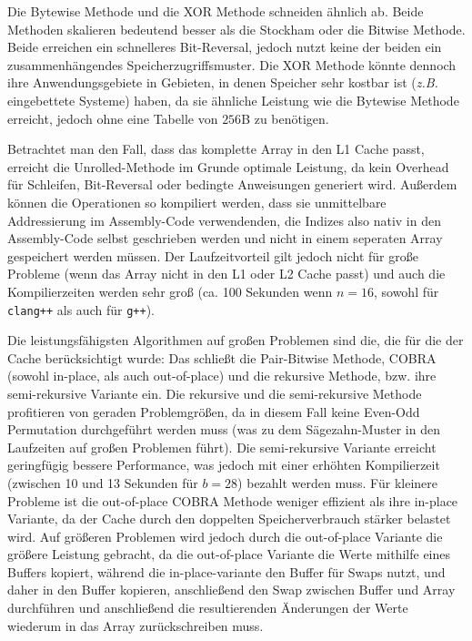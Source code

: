 \documentclass[10pt]{article}
\begin{document}
Die Bytewise Methode und die XOR Methode schneiden ähnlich ab. Beide Methoden skalieren 
bedeutend besser als die Stockham oder die Bitwise Methode. Beide erreichen ein schnelleres Bit-Reversal, 
jedoch nutzt keine der beiden ein zusammenhängendes Speicherzugriffsmuster. Die XOR Methode könnte dennoch 
ihre Anwendungsgebiete in Gebieten, in denen Speicher sehr kostbar ist (\emph{z.B.} eingebettete Systeme) haben,
da sie ähnliche Leistung wie die Bytewise Methode erreicht, jedoch ohne eine Tabelle von $256$B zu benötigen. 

Betrachtet man den Fall, dass das komplette Array in den L1 Cache passt, erreicht die Unrolled-Methode im Grunde 
optimale Leistung, da kein Overhead für Schleifen, Bit-Reversal oder bedingte Anweisungen generiert wird. 
Außerdem können die Operationen so kompiliert werden, dass sie unmittelbare Addressierung im Assembly-Code verwendenden,
die Indizes also nativ in den Assembly-Code selbst geschrieben werden und nicht in einem seperaten Array gespeichert werden müssen.
Der Laufzeitvorteil gilt jedoch nicht für große Probleme (wenn das Array nicht in den L1 oder L2 Cache passt) und auch die Kompilierzeiten 
werden sehr groß (ca. 100 Sekunden wenn $n=16$, sowohl für {\tt clang++} als auch für {\tt g++}).

Die leistungsfähigsten Algorithmen auf großen Problemen sind die, die für die der Cache berücksichtigt wurde: Das schließt die 
Pair-Bitwise Methode, COBRA (sowohl in-place, als auch out-of-place) und die rekursive Methode, bzw. ihre semi-rekursive Variante ein.
Die rekursive und die semi-rekursive Methode profitieren von geraden Problemgrößen, da in diesem Fall keine Even-Odd Permutation durchgeführt werden muss (was zu dem Sägezahn-Muster in den Laufzeiten auf großen Problemen führt). Die semi-rekursive Variante erreicht geringfügig bessere
Performance, was jedoch mit einer erhöhten Kompilierzeit (zwischen 10 und 13 Sekunden für $b=28$) bezahlt werden muss. 
Für kleinere Probleme ist die out-of-place COBRA Methode weniger effizient als ihre in-place Variante, da der Cache durch den doppelten 
Speicherverbrauch stärker belastet wird. Auf größeren Problemen wird jedoch durch die out-of-place Variante die größere Leistung gebracht,
da die out-of-place Variante die Werte mithilfe eines Buffers kopiert, während die in-place-variante den Buffer für Swaps nutzt, und daher 
in den Buffer kopieren, anschließend den Swap zwischen Buffer und Array durchführen und anschließend die 
resultierenden Änderungen der Werte wiederum in das Array zurückschreiben muss.
\end{document}
